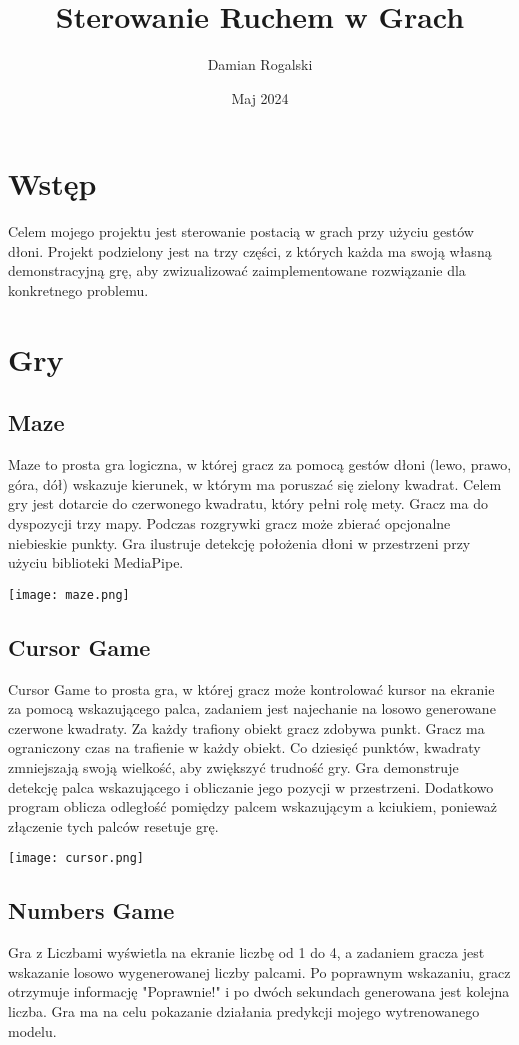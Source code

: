 \documentclass{article}
\title{Sterowanie Ruchem w Grach}
\author{Damian Rogalski}
\date{Maj 2024}
\begin{document}
\maketitle

\section{Wstęp}
Celem mojego projektu jest sterowanie postacią w grach przy użyciu gestów dłoni. Projekt podzielony jest na trzy części, z których każda ma swoją własną demonstracyjną grę, aby zwizualizować zaimplementowane rozwiązanie dla konkretnego problemu.

\section{Gry}
\subsection{Maze}
Maze to prosta gra logiczna, w której gracz za pomocą gestów dłoni (lewo, prawo, góra, dół) wskazuje kierunek, w którym ma poruszać się zielony kwadrat. Celem gry jest dotarcie do czerwonego kwadratu, który pełni rolę mety. Gracz ma do dyspozycji trzy mapy. Podczas rozgrywki gracz może zbierać opcjonalne niebieskie punkty. Gra ilustruje detekcję położenia dłoni w przestrzeni przy użyciu biblioteki MediaPipe.

\texttt{[image: maze.png]}


\subsection{Cursor Game}
Cursor Game to prosta gra, w której gracz może kontrolować kursor na ekranie za pomocą wskazującego palca, zadaniem jest najechanie na losowo generowane czerwone kwadraty. Za każdy trafiony obiekt gracz zdobywa punkt. Gracz ma ograniczony czas na trafienie w każdy obiekt. Co dziesięć punktów, kwadraty zmniejszają swoją wielkość, aby zwiększyć trudność gry. Gra demonstruje detekcję palca wskazującego i obliczanie jego pozycji w przestrzeni. Dodatkowo program oblicza odległość pomiędzy palcem wskazującym a kciukiem, ponieważ złączenie tych palców resetuje grę.

\texttt{[image: cursor.png]}

\subsection{Numbers Game}
Gra z Liczbami wyświetla na ekranie liczbę od 1 do 4, a zadaniem gracza jest wskazanie losowo wygenerowanej liczby palcami. Po poprawnym wskazaniu, gracz otrzymuje informację "Poprawnie!" i po dwóch sekundach generowana jest kolejna liczba. Gra ma na celu pokazanie działania predykcji mojego wytrenowanego modelu.
\end{document}
